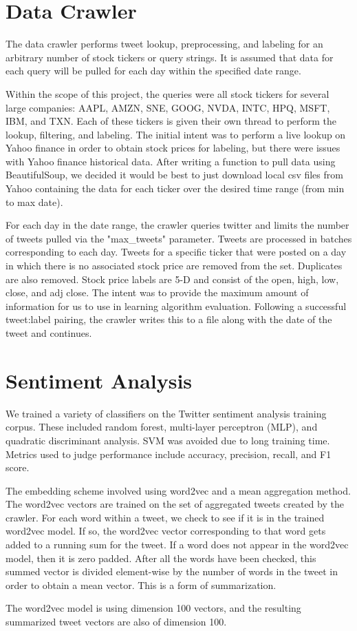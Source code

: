 \documentclass[11pt,a4paper]{article}
\begin{document}
\section{Data Crawler}
The data crawler performs tweet lookup, preprocessing, and labeling for an arbitrary number of stock tickers or query strings. It is assumed that data for each query will be pulled for each day within the specified date range. 
\par
Within the scope of this project, the queries were all stock tickers for several large companies: AAPL, AMZN, SNE, GOOG, NVDA, INTC, HPQ, MSFT, IBM, and TXN. Each of these tickers is given their own thread to perform the lookup, filtering, and labeling. The initial intent was to perform a live lookup on Yahoo finance in order to obtain stock prices for labeling, but there were issues with Yahoo finance historical data. After writing a function to pull data using BeautifulSoup, we decided it would be best to just download local csv files from Yahoo containing the data for each ticker over the desired time range (from min to max date). 
\par 
For each day in the date range, the crawler queries twitter and limits the number of tweets pulled via the "max\_tweets" parameter.  Tweets are processed in batches corresponding to each day. Tweets for a specific ticker that were posted on a day in which there is no associated stock price are removed from the set. Duplicates are also removed. Stock price labels are 5-D and consist of the open, high, low, close, and adj close. The intent was to provide the maximum amount of information for us to use in learning algorithm evaluation. Following a successful tweet:label pairing, the crawler writes this to a file along with the date of the tweet and continues.
\section{Sentiment Analysis}
We trained a variety of classifiers on the Twitter sentiment analysis training corpus. These included random forest, multi-layer perceptron (MLP), and quadratic discriminant analysis. SVM was avoided due to long training time. Metrics used to judge performance include accuracy, precision, recall, and F1 score. 
\par
The embedding scheme involved using word2vec and a mean aggregation method. The word2vec vectors are trained on the set of aggregated tweets created by the crawler. For each word within a tweet, we check to see if it is in the trained word2vec model. If so, the word2vec vector corresponding to that word gets added to a running sum for the tweet. If a word does not appear in the word2vec model, then it is zero padded. After all the words have been checked, this summed vector is divided element-wise by the number of words in the tweet in order to obtain a mean vector. This is a form of summarization. 
\par
The word2vec model is using dimension 100 vectors, and the resulting summarized tweet vectors are also of dimension 100.
\end{document}
